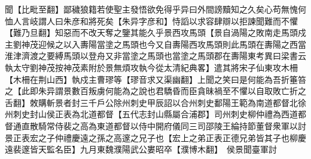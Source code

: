 聞【比毗至翻】鄙穢狼籍若使聖主發悟欲免得乎异曰外間謗黷知之久矣心苟無愧何恤人言岐謂人曰朱彦和將死矣【朱异字彦和】恃謟以求容肆辯以拒諫聞難而不懼【難乃旦翻】知惡而不改天奪之鑒其能久乎景西攻馬頭【景自渦陽之敗南走馬頭戍主劉神茂迎候之以入夀陽當塗之馬頭也今又自夀陽西攻馬頭則此馬頭在夀陽之西當淮津濟渡之要縛馬頭以登舟又非當塗之馬頭也當塗之馬頭郡在夀陽東考異曰梁書云執太守劉神茂按神茂素附於景無煩攻執今從太清紀典畧】遣其將宋子仙東攻木柵【木柵在荆山西】執戍主曹璆等【璆音求又渠幽翻】上聞之笑曰是何能為吾折箠笞之【此即朱异謂景數百叛虜何能為之說也君驕昏而臣貪昧禍至不懼以自取敗亡折之舌翻】敇購斬景者封三千戶公除州刺史甲辰詔以合州刺史鄱陽王範為南道都督北徐州刺史封山侯正表為北道都督【五代志封山縣屬合浦郡】司州刺史柳仲禮為西道都督通直散騎常侍裴之高為東道都督以侍中開府儀同三司邵陵王綸持節董督衆軍以討景正表宏之子仲禮慶遠之孫之高邃之兄子也【宏上之弟正表正德兄弟皆其子也柳慶遠裴邃皆天監名臣】九月東魏濮陽武公婁昭卒【濮博木翻】　侯景聞臺軍討


